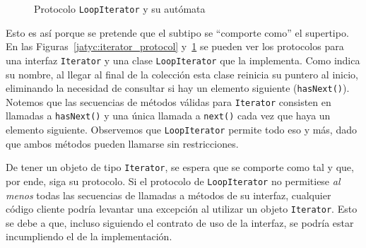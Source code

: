 \begin{figure}[htbp]
\centering
\begin{minipage}[c]{0.50\textwidth}
    
\end{minipage}
\hfill
\begin{minipage}[c]{0.46\textwidth}
\centering
{}
\end{minipage}
\caption{Protocolo \texttt{LoopIterator} y su autómata}
\label{jatyc:loopiterator_protocol}
\end{figure}

Esto es así porque se pretende que el subtipo se ``comporte como'' el supertipo. En las Figuras~\ref{jatyc:iterator_protocol} y~\ref{jatyc:loopiterator_protocol} se pueden ver los protocolos para una interfaz \texttt{Iterator} y una clase \texttt{LoopIterator} que la implementa. Como indica su nombre, al llegar al final de la colección esta clase reinicia su puntero al inicio, eliminando la necesidad de consultar si hay un elemento siguiente (\texttt{hasNext()}). Notemos que las secuencias de métodos válidas para \texttt{Iterator} consisten en llamadas a \texttt{hasNext()} y una única llamada a \texttt{next()} cada vez que haya un elemento siguiente. Observemos que \texttt{LoopIterator} permite todo eso y más, dado que ambos métodos pueden llamarse sin restricciones.

De tener un objeto de tipo \texttt{Iterator}, se espera que se comporte como tal y que, por ende, siga su protocolo. Si el protocolo de \texttt{LoopIterator} no permitiese \textit{al menos} todas las secuencias de llamadas a métodos de su interfaz, cualquier código cliente podría levantar una excepción al utilizar un objeto \texttt{Iterator}. Esto se debe a que, incluso siguiendo el contrato de uso de la interfaz, se podría estar incumpliendo el de la implementación.

